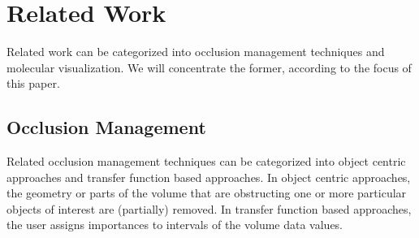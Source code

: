 \section{Related Work}
Related work can be categorized into occlusion management techniques and molecular visualization. We will concentrate the former, according to the focus of this paper.

\subsection{Occlusion Management}
Related occlusion management techniques can be categorized into object centric approaches and transfer function based approaches. In object centric approaches, the geometry or parts of the volume that are obstructing one or more particular objects of interest are (partially) removed. In transfer function based approaches, the user assigns importances to intervals of the volume data values.

